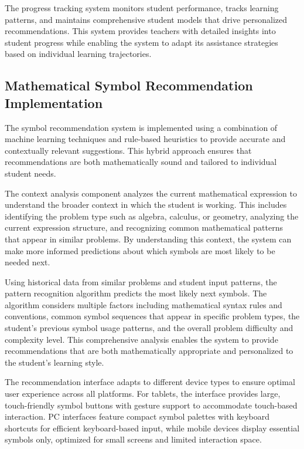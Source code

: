 \documentclass[conference]{IEEEtran}
\begin{document}
\begin{IEEEkeywords}
The progress tracking system monitors student performance, tracks learning patterns, and maintains comprehensive student models that drive personalized recommendations. This system provides teachers with detailed insights into student progress while enabling the system to adapt its assistance strategies based on individual learning trajectories.

\subsection{Mathematical Symbol Recommendation Implementation}

The symbol recommendation system is implemented using a combination of machine learning techniques and rule-based heuristics to provide accurate and contextually relevant suggestions. This hybrid approach ensures that recommendations are both mathematically sound and tailored to individual student needs.

The context analysis component analyzes the current mathematical expression to understand the broader context in which the student is working. This includes identifying the problem type such as algebra, calculus, or geometry, analyzing the current expression structure, and recognizing common mathematical patterns that appear in similar problems. By understanding this context, the system can make more informed predictions about which symbols are most likely to be needed next.

Using historical data from similar problems and student input patterns, the pattern recognition algorithm predicts the most likely next symbols. The algorithm considers multiple factors including mathematical syntax rules and conventions, common symbol sequences that appear in specific problem types, the student's previous symbol usage patterns, and the overall problem difficulty and complexity level. This comprehensive analysis enables the system to provide recommendations that are both mathematically appropriate and personalized to the student's learning style.

The recommendation interface adapts to different device types to ensure optimal user experience across all platforms. For tablets, the interface provides large, touch-friendly symbol buttons with gesture support to accommodate touch-based interaction. PC interfaces feature compact symbol palettes with keyboard shortcuts for efficient keyboard-based input, while mobile devices display essential symbols only, optimized for small screens and limited interaction space.




\end{IEEEkeywords}
\end{document}

